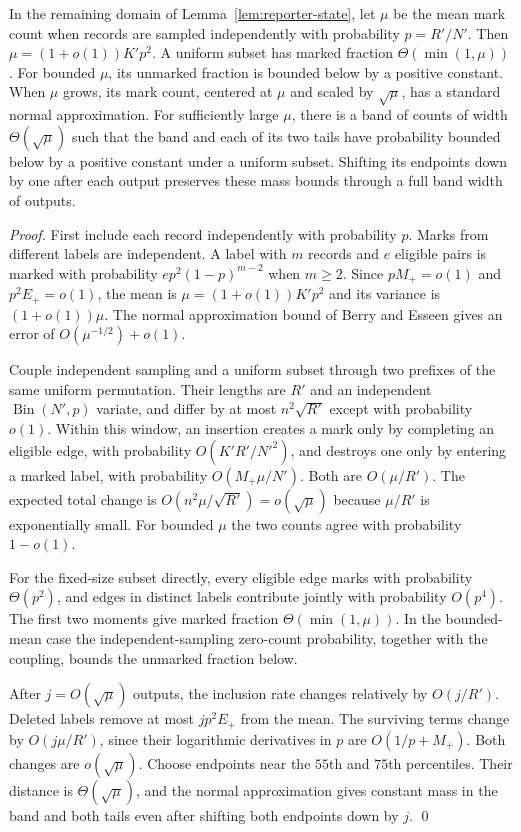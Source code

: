 \documentclass[runningheads,envcountsame,envcountsect,orivec]{llncs}
\begin{document}
\begin{lemma}
\label{lem:reporter-marks}
In the remaining domain of Lemma~\ref{lem:reporter-state},
let $\mu$ be the mean mark count when records are sampled
independently with probability $p=R'/N'$. Then
$\mu=(1+o(1))K'p^2$. A uniform subset has marked fraction
$\Theta(\min(1,\mu))$. For bounded $\mu$, its unmarked
fraction is bounded below by a positive constant. When
$\mu$ grows, its mark count, centered at $\mu$ and scaled
by $\sqrt\mu$, has a standard normal approximation.
For sufficiently large $\mu$, there is a band of counts of width
$\Theta(\sqrt\mu)$ such that the band and each of its two tails
have probability bounded below by a positive constant under a uniform subset. Shifting
its endpoints down by one after each output preserves
these mass bounds through a full band width of outputs.
\end{lemma}

\begin{proof}
First include each record independently with probability
$p$. Marks from different labels are independent. A label
with $m$ records and $e$ eligible pairs is marked with
probability $ep^2(1-p)^{m-2}$ when $m\ge2$. Since
$pM_+=o(1)$ and $p^2E_+=o(1)$, the mean is
$\mu=(1+o(1))K'p^2$ and its variance is $(1+o(1))\mu$.
The normal approximation bound of Berry and Esseen gives
an error of
$O(\mu^{-1/2})+o(1)$.

Couple independent sampling and a uniform subset through
two prefixes of the same uniform permutation. Their
lengths are $R'$ and an independent
$\operatorname{Bin}(N',p)$ variate, and differ by at most
$n^2\sqrt{R'}$ except with probability $o(1)$. Within this
window, an insertion creates a mark only by completing an
eligible edge, with probability $O(K'R'/N'^2)$, and destroys
one only by entering a marked label, with probability
$O(M_+\mu/N')$. Both are $O(\mu/R')$. The expected total
change is $O(n^2\mu/\sqrt{R'})=o(\sqrt\mu)$ because
$\mu/R'$ is exponentially small. For bounded $\mu$ the two
counts agree with probability $1-o(1)$.

For the fixed-size subset directly, every eligible edge
marks with probability $\Theta(p^2)$, and edges in distinct
labels contribute jointly with probability $O(p^4)$.
The first two moments give marked fraction
$\Theta(\min(1,\mu))$. In the bounded-mean case the
independent-sampling zero-count probability, together with
the coupling, bounds the unmarked fraction below.

After $j=O(\sqrt\mu)$ outputs, the inclusion rate changes
relatively by $O(j/R')$. Deleted labels remove at most
$jp^2E_+$ from the mean. The surviving terms change by
$O(j\mu/R')$, since their logarithmic derivatives in $p$
are $O(1/p+M_+)$. Both changes are $o(\sqrt\mu)$.
Choose endpoints near the $55$th and $75$th percentiles.
Their distance is $\Theta(\sqrt\mu)$, and the normal
approximation gives constant mass in the band and both
tails even after shifting both endpoints down by $j$.
\qed
\end{proof}
\end{document}
